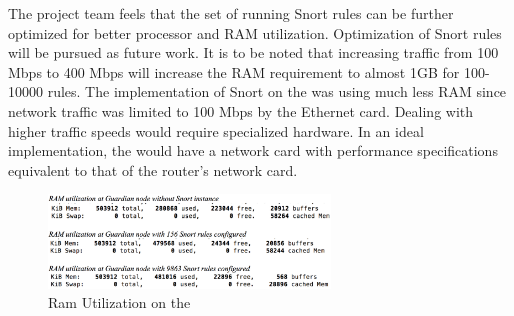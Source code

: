 The project team  feels that the set of running Snort rules can be further optimized for better processor and RAM utilization. Optimization of Snort rules will be pursued as future work. It is to be noted that increasing traffic from 100 Mbps to 400 Mbps will increase the RAM requirement to almost 1GB for 100-10000 rules. The implementation of Snort on the \nodename was using much less RAM since network traffic was limited to 100 Mbps by the Ethernet card. Dealing with higher traffic speeds would require specialized hardware. In an ideal implementation, the \nodename would have a network card with performance specifications equivalent to that of the router's network card.

\begin{figure}
    \centering
    \includegraphics[width=0.85\linewidth,  height=2.5cm]{figs/SnortRam.png}
    \caption{Ram Utilization on the \nodename}
    \label{fig:ramutil}
\end{figure}

